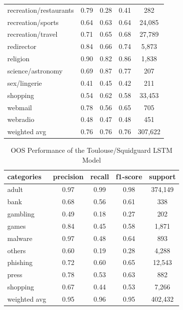 \documentclass[12pt, letterpaper]{article}
\begin{document}
\begin{table}[!htb]
\begin{tabular}{ l c c c c }
recreation/restaurants   &     0.79  &    0.28  &    0.41   &    282 \\
     recreation/sports   &     0.64  &    0.63  &    0.64   &  24,085 \\
     recreation/travel   &     0.71  &    0.65  &    0.68   &  27,789 \\
            redirector   &     0.84  &    0.66  &    0.74   &   5,873 \\
              religion   &     0.90  &    0.82  &    0.86   &   1,838 \\
     science/astronomy   &     0.69  &    0.87  &    0.77   &    207 \\
          sex/lingerie   &     0.41  &    0.45  &    0.42   &    211 \\
              shopping   &     0.54  &    0.62  &    0.58   &  33,453 \\
               webmail   &     0.78  &    0.56  &    0.65   &    705 \\
              webradio   &     0.48  &    0.47  &    0.48   &    451 \\
          weighted avg   &     0.76  &    0.76  &    0.76   &  307,622 \\
\hline
\end{tabular}
\label{tab:shalla_model}
\end{table}

\begin{table}[!htb]
\centering
\tiny
\caption{OOS Performance of the Toulouse/Squidguard LSTM Model}
\begin{tabular}{ l c c c c }
\hline
categories  & precision & recall & f1-score & support \\
\hline
	   adult     & 0.97    & 0.99    & 0.98    & 374,149 \\
        bank     & 0.68    & 0.56    & 0.61    & 338 \\
    gambling     & 0.49    & 0.18    & 0.27    & 202 \\
       games     & 0.84    & 0.45    & 0.58    & 1,871 \\
     malware     & 0.97    & 0.48    & 0.64    & 893 \\
      others     & 0.60    & 0.19    & 0.28    & 4,288 \\
    phishing     & 0.72    & 0.60    & 0.65    & 12,543 \\
       press     & 0.78    & 0.53    & 0.63    & 882 \\
    shopping     & 0.67    & 0.44    & 0.53    & 7,266 \\
weighted avg     & 0.95    & 0.96    & 0.95    & 402,432 \\
\hline
\end{tabular}
\label{tab:toulouse_model}
\end{table}
\end{document}
